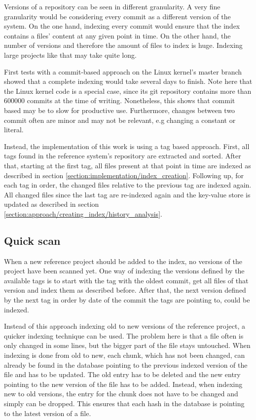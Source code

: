 Versions of a repository can be seen in different granularity.
A very fine granularity would be considering every commit as a different version of the system.
On the one hand, indexing every commit would ensure that the index contains a files' content at any given point in time.
On the other hand, the number of versions and therefore the amount of files to index is huge.
Indexing large projects like that may take quite long.

First tests with a commit-based approach on the Linux kernel's master branch showed that a complete indexing would take several days to finish.
Note here that the Linux kernel code is a special case, since its git repository contains more than 600000 commits at the time of writing.
Nonetheless, this shows that commit based may be to slow for productive use.
Furthermore, changes between two commit often are minor and may not be relevant, e.g changing a constant or literal.

Instead, the implementation of this work is using a tag based approach.
First, all tags found in the reference system's repository are extracted and sorted.
After that, starting at the first tag, all files present at that point in time are indexed as described in section \ref{section:implementation/index_creation}.
Following up, for each tag in order, the changed files relative to the previous tag are indexed again.
All changed files since the last tag are re-indexed again and the key-value store is updated as described in section \ref{section:approach/creating_index/history_analysis}.

\subsection{Quick scan}\label{section:implementation/history_analysis/quick_scan}
When a new reference project should be added to the index, no versions of the project have been scanned yet.
One way of indexing the versions defined by the available tags is to start with the tag with the oldest commit, get all files of that version and index them as described before.
After that, the next version defined by the next tag in order by date of the commit the tags are pointing to, could be indexed.

Instead of this approach indexing old to new versions of the reference project, a quicker indexing technique can be used.
The problem here is that a file often is only changed in some lines, but the bigger part of the file stays untouched.
When indexing is done from old to new, each chunk, which has not been changed, can already be found in the database pointing to the previous indexed version of the file and has to be updated.
The old entry has to be deleted and the new entry pointing to the new version of the file has to be added.
Instead, when indexing new to old versions, the entry for the chunk does not have to be changed and simply can be dropped.
This ensures that each hash in the database is pointing to the latest version of a file.

